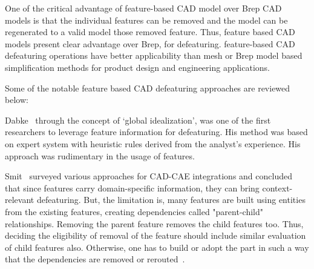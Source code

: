 One of the critical advantage of feature-based CAD model over Brep CAD models is that the individual features can be removed and the model can be regenerated to a valid model  those removed feature. Thus, feature based CAD models present clear advantage over Brep, for defeaturing.  feature-based CAD defeaturing operations have better applicability than mesh or Brep model based simplification methods for product design and engineering applications. 

Some of the notable feature based CAD defeaturing approaches are reviewed below:
 
Dabke~\cite{Dabke1994} through the concept of  `global idealization', was one of the first researchers to leverage feature information for defeaturing. His method was based on expert system with heuristic rules derived from the analyst's experience. His approach was  rudimentary in the usage of features.

	 
 Smit~\cite{Smit2009} surveyed various approaches for CAD-CAE integrations and concluded that since features carry domain-specific information, they can bring context-relevant defeaturing. But, the limitation is, many features are built using entities from the existing features, creating dependencies called "parent-child" relationships. Removing the parent feature removes the child features too. Thus, deciding the eligibility of removal of the feature should include similar evaluation of child features also. Otherwise, one has to build or adopt the part in such a way that the dependencies are removed or rerouted~\cite{AmesRiveraWebbHensinger1997}.

